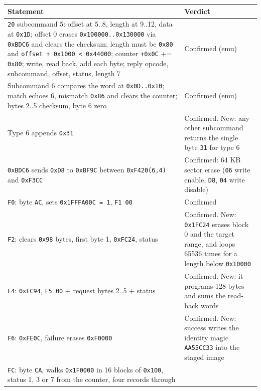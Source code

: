 {\def\LTcaptype{none} %
\begin{longtable}[]{@{}
  >{\raggedright\arraybackslash}p{}
  >{\raggedright\arraybackslash}p{}@{}}
\toprule\noalign{}
\begin{minipage}[b]{\linewidth}\raggedright
Statement
\end{minipage} & \begin{minipage}[b]{\linewidth}\raggedright
Verdict
\end{minipage} \\
\midrule\noalign{}
\endhead
\bottomrule\noalign{}
\endlastfoot
\texttt{20} subcommand 5: offset at 5..8, length at 9..12, data at
\texttt{0x1D}; offset 0 erases \texttt{0x100000..0x130000} via
\texttt{0xBDC6} and clears the checksum; length must be \texttt{0x80}
and \texttt{offset\ +\ 0x1000\ \textless{}\ 0x44000}; counter
\texttt{+0x0C} += \texttt{0x80}; write, read back, add each byte; reply
opcode, subcommand, offset, status, length 7 & Confirmed (emu) \\
Subcommand 6 compares the word at \texttt{0x0D..0x10}; match echoes 6,
mismatch \texttt{0x86} and clears the counter; bytes 2..5 checksum, byte
6 zero & Confirmed (emu) \\
Type 6 appends \texttt{0x31} & Confirmed. New: any other subcommand
returns the single byte \texttt{31} for type 6 \\
\texttt{0xBDC6} sends \texttt{0xD8} to \texttt{0xBF9C} between
\texttt{0xF420(6,4)} and \texttt{0xF3CC} & Confirmed: 64 KB sector erase
(\texttt{06} write enable, \texttt{D8}, \texttt{04} write disable) \\
\texttt{F0}: byte \texttt{AC}, sets \texttt{0x1FFFA00C\ =\ 1},
\texttt{F1\ 00} & Confirmed \\
\texttt{F2}: clears \texttt{0x98} bytes, first byte 1, \texttt{0xFC24},
status & Confirmed. New: \texttt{0x1FC24} erases block 0 and the target
range, and loops 65536 times for a length below \texttt{0x10000} \\
\texttt{F4}: \texttt{0xFC94}, \texttt{F5\ 00} + request bytes 2..5 +
status & Confirmed. New: it programs 128 bytes and sums the read-back
words \\
\texttt{F6}: \texttt{0xFE0C}, failure erases \texttt{0xF0000} &
Confirmed. New: success writes the identity magic \texttt{AA55CC33} into
the staged image \\
\texttt{FC}: byte \texttt{CA}, walks \texttt{0x1F0000} in 16 blocks of
\texttt{0x100}, status 1, 3 or 7 from the counter, four records through

\end{longtable}}
